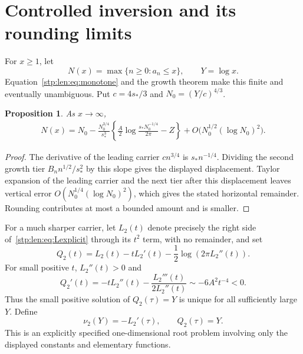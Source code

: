 \documentclass[11pt]{article}
\newtheorem{proposition}[theorem]{Proposition}
\theoremstyle{remark}\newtheorem{remark}[theorem]{Remark}
\newcommand{\as}{s_*}\newcommand{\eps}{\varepsilon}\newcommand{\poc}[2]{(#1;#2)_\infty}
\begin{document}
\section{Controlled inversion and its rounding limits}\label{stp:len:sec:inverse}
For $x\ge1$, let
\[
 N(x)=\max\{n\ge0:a_n\le x\},\qquad Y=\log x.
\]
Equation~\eqref{stp:len:eq:monotone} and the growth theorem make this finite and eventually unambiguous. Put $c=4\as/3$ and $N_0=(Y/c)^{4/3}$.

\begin{proposition}\label{stp:len:prop:inversefirst}
As $x\to\infty$,
\begin{equation}\label{stp:len:eq:inversefirst}
\begin{split}
 N(x)=N_0-\frac{N_0^{3/4}}{\as^3}
 \left\{\frac A2\log\frac{\as N_0^{-1/4}}{2\pi}-Z\right\}
 +O\bigl(N_0^{1/2}(\log N_0)^2\bigr).
\end{split}
\end{equation}
\end{proposition}
\begin{proof}
The derivative of the leading carrier $cn^{3/4}$ is $\as n^{-1/4}$. Dividing the second growth tier $B_n n^{1/2}/\as^2$ by this slope gives the displayed displacement. Taylor expansion of the leading carrier and the next tier after this displacement leaves vertical error $O(N_0^{1/4}(\log N_0)^2)$, which gives the stated horizontal remainder. Rounding contributes at most a bounded amount and is smaller.
\end{proof}

For a much sharper carrier, let $L_2(t)$ denote precisely the right side of~\eqref{stp:len:eq:Lexplicit} through its $t^2$ term, with no remainder, and set
\begin{equation}\label{stp:len:eq:Q2}
 Q_2(t)=L_2(t)-tL_2'(t)-\frac12\log(2\pi L_2''(t)).
\end{equation}
For small positive $t$, $L_2''(t)>0$ and
\[
 Q_2'(t)=-tL_2''(t)-\frac{L_2'''(t)}{2L_2''(t)}
 \sim-6A^2t^{-4}<0.
\]
Thus the small positive solution of $Q_2(\tau)=Y$ is unique for all sufficiently large $Y$. Define
\begin{equation}\label{stp:len:eq:nu2}
 \nu_2(Y)=-L_2'(\tau),\qquad Q_2(\tau)=Y.
\end{equation}
This is an explicitly specified one-dimensional root problem involving only the displayed constants and elementary functions.
\end{document}
